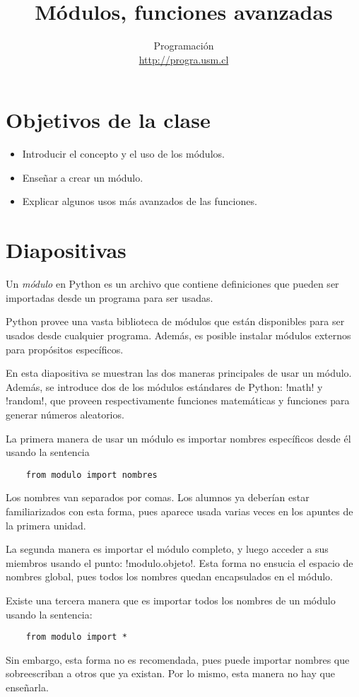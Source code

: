 \documentclass[10pt]{article}
\title{Módulos, funciones avanzadas}
\author{Programación \\ \url{http://progra.usm.cl}}
\date{}
\begin{document}
  \maketitle

  \section*{Objetivos de la clase}
  \begin{itemize}
    \item Introducir el concepto y el uso de los módulos.
    \item Enseñar a crear un módulo.
    \item Explicar algunos usos más avanzados de las funciones.
  \end{itemize}

  \section*{Diapositivas}


  Un \emph{módulo} en Python
  es un archivo que contiene definiciones
  que pueden ser importadas desde un programa para ser usadas.

  Python provee una vasta biblioteca de módulos
  que están disponibles para ser usados desde cualquier programa.
  Además, es posible instalar módulos externos
  para propósitos específicos.

  En esta diapositiva
  se muestran las dos maneras principales de usar un módulo.
  Además, se introduce dos de los módulos estándares de Python: \li!math! y \li!random!,
  que proveen respectivamente funciones matemáticas y funciones para generar números aleatorios.

  La primera manera de usar un módulo
  es importar nombres específicos desde él
  usando la sentencia
  \begin{lstlisting}
    from modulo import nombres
  \end{lstlisting}
  Los nombres van separados por comas.
  Los alumnos ya deberían estar familiarizados con esta forma,
  pues aparece usada varias veces en los apuntes de la primera unidad.

  La segunda manera es importar el módulo completo,
  y luego acceder a sus miembros usando el punto:
  \li!modulo.objeto!.
  Esta forma no ensucia el espacio de nombres global,
  pues todos los nombres quedan encapsulados en el módulo.

  Existe una tercera manera que es importar todos los nombres de un módulo
  usando la sentencia:
  \begin{lstlisting}
    from modulo import *
  \end{lstlisting}
  Sin embargo, esta forma no es recomendada,
  pues puede importar nombres que sobreescriban a otros que ya existan.
  Por lo mismo, esta manera no hay que enseñarla.
\end{document}
